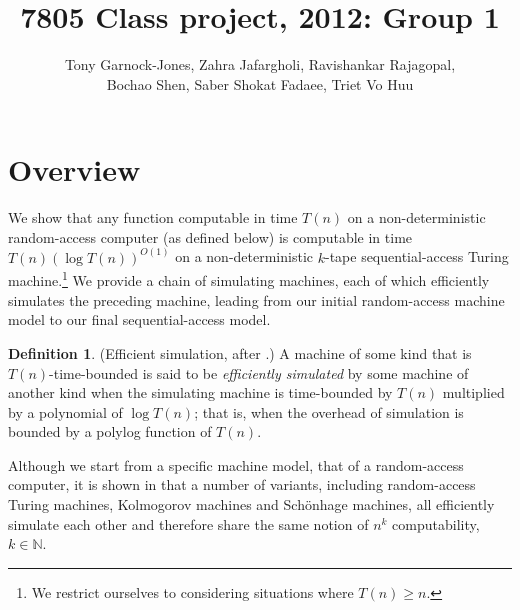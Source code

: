 \documentclass[english]{article}
\theoremstyle{plain}
\theoremstyle{definition}
\newtheorem{defn}[thm]{Definition}
\theoremstyle{plain}
\begin{document}
\title{7805 Class project, 2012: Group 1}
\author{
  Tony Garnock-Jones,
  Zahra Jafargholi,
  Ravishankar Rajagopal,\\
  Bochao Shen,
  Saber Shokat Fadaee,
  Triet Vo Huu
}
\maketitle

\section{Overview}

We show that any function computable in time $T(n)$ on a
non-deterministic random-access computer (as defined below) is
computable in time $T(n)(\log T(n))^{O(1)}$ on a non-deterministic
$k$-tape sequential-access Turing machine.\footnote{We restrict
  ourselves to considering situations where $T(n) \geq n$.} We provide
a chain of simulating machines, each of which efficiently simulates
the preceding machine, leading from our initial random-access machine
model to our final sequential-access model.

\begin{defn}

  (Efficient simulation, after \cite{DBLP:conf/ershov/GurevichS89}.) A
  machine of some kind that is $T(n)$-time-bounded is said to be
  \emph{efficiently simulated} by some machine of another kind when
  the simulating machine is time-bounded by $T(n)$ multiplied by a
  polynomial of $\log T(n)$; that is, when the overhead of simulation
  is bounded by a polylog function of $T(n)$.
\end{defn}

Although we start from a specific machine model, that of a
random-access computer, it is shown in
\cite{DBLP:conf/ershov/GurevichS89} that a number of variants,
including random-access Turing machines, Kolmogorov machines and
Sch\"{o}nhage machines, all efficiently simulate each other and
therefore share the same notion of $n^k$ computability,
$k\in\mathbb{N}$.
\end{document}
